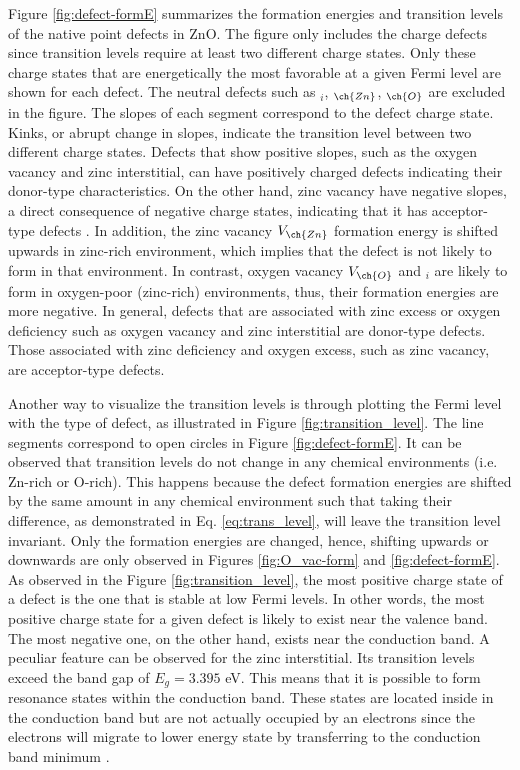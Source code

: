 Figure \ref{fig:defect-formE} summarizes the formation energies and transition levels of the native point defects in ZnO. The figure only includes the charge defects since transition levels require at least two different charge states. Only these charge states that are energetically the most favorable at a given Fermi level are shown for each defect. The neutral defects such as $_i$, $_{\ch{Zn}}$, $_{\ch{O}}$ are excluded in the figure. The slopes of each segment correspond to the defect charge state. Kinks, or abrupt change in slopes, indicate the transition level between two different charge states. Defects that show positive slopes, such as the oxygen vacancy and zinc interstitial,  can have positively charged defects indicating their donor-type characteristics. On the other hand, zinc vacancy have negative slopes, a direct consequence of negative charge states, indicating that it has acceptor-type defects \citep{Oba2011}. In addition, the zinc vacancy $V_{\ch{Zn}}$ formation energy is shifted upwards in zinc-rich environment, which implies that the defect is not likely to form in that environment. In contrast, oxygen vacancy $V_{\ch{O}}$ and $_i$ are likely to form in oxygen-poor (zinc-rich) environments, thus, their formation energies are more negative. In general, defects that are associated with zinc excess or oxygen deficiency such as oxygen vacancy and zinc interstitial are donor-type defects. Those associated with zinc deficiency and oxygen excess, such as zinc vacancy, are acceptor-type defects.

Another way to visualize the transition levels is through plotting the Fermi level with the type of defect, as illustrated in Figure \ref{fig:transition_level}. The line segments correspond to open circles in Figure \ref{fig:defect-formE}. It can be observed that transition levels do not change in any chemical environments (i.e. Zn-rich or O-rich). This happens because the defect formation energies are shifted by the same amount  in any chemical environment such that taking their difference, as demonstrated in Eq. \eqref{eq:trans_level}, will leave the transition level invariant. Only the formation energies are changed, hence, shifting upwards or downwards are only observed in Figures \ref{fig:O_vac-form} and \ref{fig:defect-formE}. As observed in the Figure \ref{fig:transition_level}, the most positive charge state of a defect is the one that is stable at low Fermi levels. In other words, the most positive charge state for a given defect is likely to exist near the valence band. The most negative one, on the other hand, exists near the conduction band. A peculiar feature can be observed for the zinc interstitial. Its transition levels exceed the band gap of $E_g = 3.395$ eV. This means that it is possible to form resonance states within the conduction band. These states are located inside in the conduction band but are not actually occupied by an electrons since the electrons will migrate to lower energy state by transferring to the conduction band minimum \citep{Freysoldt2014}.


